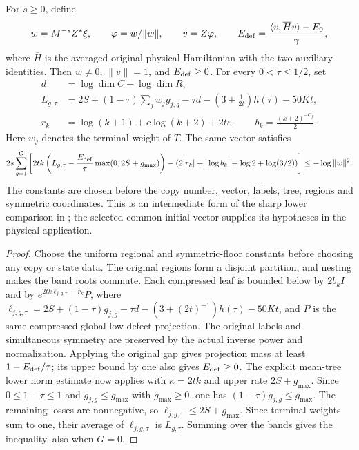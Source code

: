 \begin{theorem}
  For $s\geq0$, define
  \begin{align*}
    w=M^{-s}Z^*\xi,\qquad \varphi=w/\|w\|,\qquad v=Z\varphi,\qquad
    E_{\rm def}=\frac{\langle v,\overline H v\rangle-E_0}{\gamma},
  \end{align*}
  where $\overline H$ is the averaged original physical Hamiltonian
  with the two auxiliary identities.
  Then $w\ne0$, $\|v\|=1$, and $E_{\rm def}\geq0$.
  For every $0<\tau\leq1/2$, set
  \begin{align*}
    d&=\log\dim C+\log\dim R,\\
    L_{g,\tau}&=2S+(1-\tau)\sum_jw_jg_{j,g}-\tau d-
      \left(3+\frac1{2t}\right)h(\tau)-50Kt,\\
    r_k&=\log(k+1)+c\log(k+2)+2t\varepsilon,\qquad
    b_k=\frac{(k+2)^{-C_f}}2.
  \end{align*}
  Here $w_j$ denotes the terminal weight of $T$. The same vector satisfies
  \begin{align*}
    2s\sum_{g=1}^{G}\left[
      2tk\left(L_{g,\tau}-\frac{E_{\rm def}}\tau\max(0,2S+g_{\max})\right)
      -\left(2|r_k|+|\log b_k|+\log2+\log(3/2)\right)
    \right]
    \leq-\log\|w\|^2.
  \end{align*}
  The constants are chosen before the copy number, vector, labels,
  tree, regions and symmetric coordinates. This is an intermediate
  form of the sharp lower comparison in
  \cite[Section~8]{OpenAI2026AreaLaw}; the selected common initial vector
  supplies its hypotheses in the physical application.
\end{theorem}
\begin{proof}
    \leanok
  Choose the uniform regional and symmetric-floor constants before
  choosing any copy or state data. The original regions form a disjoint
  partition, and nesting makes the band roots commute.
  Each compressed leaf is bounded below by $2b_kI$ and by
  $e^{2tk\ell_{j,g,\tau}-r_k}P$, where
  $\ell_{j,g,\tau}=2S+(1-\tau)g_{j,g}-\tau d-
  (3+(2t)^{-1})h(\tau)-50Kt$, and $P$ is the same compressed global
  low-defect projection. The original labels and simultaneous symmetry
  are preserved by the actual inverse power and normalization.
  Applying the original gap gives projection mass at least
  $1-E_{\rm def}/\tau$; its upper bound by one also gives
  $E_{\rm def}\geq0$.
  The explicit mean-tree lower norm estimate now applies with
  $\kappa=2tk$ and upper rate $2S+g_{\max}$.
  Since $0\leq1-\tau\leq1$ and $g_{j,g}\leq g_{\max}$ with
  $g_{\max}\geq0$, one has $(1-\tau)g_{j,g}\leq g_{\max}$.
  The remaining losses are nonnegative, so
  $\ell_{j,g,\tau}\leq2S+g_{\max}$.
  Since terminal weights sum to one, their average of
  $\ell_{j,g,\tau}$ is $L_{g,\tau}$.
  Summing over the bands gives the inequality, also when $G=0$.
\end{proof}
